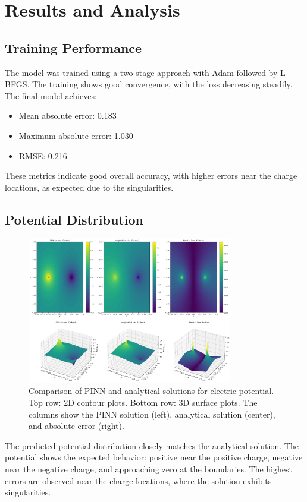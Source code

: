 \documentclass[12pt,a4paper]{report}
\begin{document}
	
	\chapter{Results and Analysis}
	
	\section{Training Performance}
	The model was trained using a two-stage approach with Adam followed by L-BFGS. The training shows good convergence, with the loss decreasing steadily. The final model achieves:
	\begin{itemize}
		\item Mean absolute error: 0.183
		\item Maximum absolute error: 1.030
		\item RMSE: 0.216
	\end{itemize}
	
	These metrics indicate good overall accuracy, with higher errors near the charge locations, as expected due to the singularities.
	
	\section{Potential Distribution}
	\begin{figure}[H]
		\centering
		\includegraphics[width=0.8\textwidth]{poisson_results.png}
		\caption{Comparison of PINN and analytical solutions for electric potential. Top row: 2D contour plots. Bottom row: 3D surface plots. The columns show the PINN solution (left), analytical solution (center), and absolute error (right).}
	\end{figure}
	
	The predicted potential distribution closely matches the analytical solution. The potential shows the expected behavior: positive near the positive charge, negative near the negative charge, and approaching zero at the boundaries. The highest errors are observed near the charge locations, where the solution exhibits singularities.
	
\end{document}
